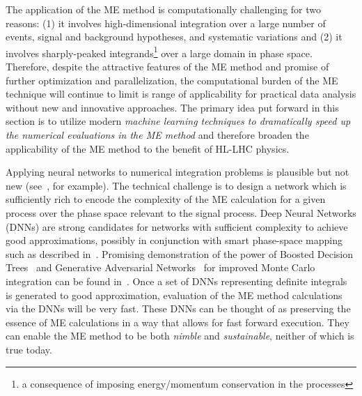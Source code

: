 The application of the ME method %
is computationally challenging for two reasons: (1) it involves high-dimensional integration over a large number of events, signal and background hypotheses, and systematic variations and (2) it involves sharply-peaked integrands\footnote{a consequence of imposing energy/momentum conservation in the processes} over a large domain in phase space. Therefore,
despite the attractive features of the ME method and promise of further optimization and parallelization, the computational burden of the ME technique will continue to limit is range of applicability for practical data analysis without new and innovative approaches. The primary idea put forward in this section is to utilize modern \emph{machine learning techniques to dramatically speed up the numerical evaluations in the ME method} and therefore broaden the applicability of the ME method to the benefit of HL-LHC physics.

Applying neural networks to numerical integration problems is plausible but not new (see~\cite{CSEarticle2006,TICNC4344207,IJMC2013}, for example). The technical challenge is to design a network which is sufficiently rich to encode the complexity of the ME calculation for a given process over the phase space relevant to the signal process. Deep Neural Networks (DNNs) are strong candidates for networks with sufficient complexity to achieve good approximations, possibly in conjunction with smart phase-space mapping such as described in~\cite{Artoisenet:2010cn}. Promising demonstration of the power of Boosted Decision Trees~\cite{friedman2000,friedman2001} and Generative Adversarial Networks~\cite{GAN2014arXiv1406.2661G} for improved Monte Carlo integration can be found in~\cite{Bendavid:2017zhk}. Once a set of DNNs representing definite integrals is generated to good approximation, evaluation of the ME method calculations via the DNNs will be very fast. These DNNs can be thought of as preserving the essence of ME calculations in a way that allows for fast forward execution. They can enable the ME method to be both \emph{nimble} and \emph{sustainable}, neither of which is true today.

